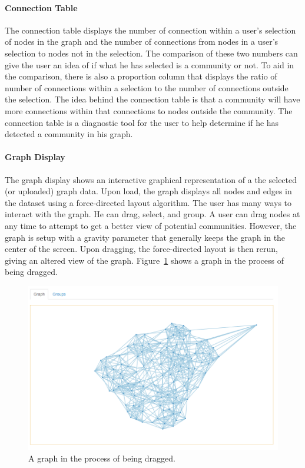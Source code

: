 \documentclass{article}
\begin{document}
\paragraph{Connection Table}
The connection table displays the number of connection within a user's selection of nodes in the graph and the number of connections from nodes in a user's selection to nodes not in the selection. The comparison of these two numbers can give the user an idea of if what he has selected is a community or not. To aid in the comparison, there is also a proportion column that displays the ratio of number of connections within a selection to the number of connections outside the selection. The idea behind the connection table is that a community will have more connections within that connections to nodes outside the community. The connection table is a diagnostic tool for the user to help determine if he has detected a community in his graph. 

\paragraph{Graph Display}
The graph display shows an interactive graphical representation of a the selected (or uploaded) graph data. Upon load, the graph displays all nodes and edges in the dataset using a force-directed layout algorithm. The user has many ways to interact with the graph. He can drag, select, and group. A user can drag nodes at any time to attempt to get a better view of potential communities. However, the graph is setup with a gravity parameter that generally keeps the graph in the center of the screen. Upon dragging, the force-directed layout is then rerun, giving an altered view of the graph. Figure~\ref{fig:graphdrag} shows a graph in the process of being dragged.

\begin{figure}[H]
\centering
\includegraphics[width=\textwidth]{images/graphdrag.png}
\caption{\label{fig:graphdrag} A graph in the process of being dragged.}
\end{figure}
\end{document}
